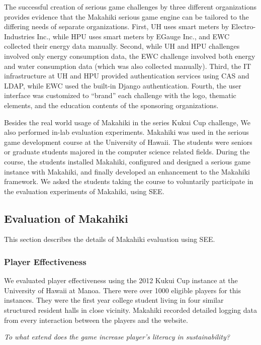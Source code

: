 \documentclass{sigchi}
\begin{document}
The successful creation of serious game challenges by three different
organizations provides evidence that the Makahiki serious game engine
can be tailored to the differing needs of separate
organizations. First, UH uses smart meters by Electro-Industries Inc.,
while HPU uses smart meters by EGauge Inc., and EWC collected their
energy data manually. Second, while UH and HPU challenges involved
only energy consumption data, the EWC challenge involved both energy
and water consumption data (which was also collected manually).
Third, the IT infrastructure at UH and HPU provided authentication
services using CAS and LDAP, while EWC used the built-in Django
authentication. Fourth, the user interface was customized to ``brand''
each challenge with the logo, thematic elements, and the education
contents of the sponsoring organizations.

Besides the real world usage of Makahiki in the series Kukui Cup
challenge, We also performed in-lab evaluation experiments. Makahiki
was used in the serious game development course at the University of
Hawaii. The students were seniors or graduate students majored in the
computer science related fields. During the course, the students 
installed Makahiki, configured and designed a serious game instance with
Makahiki, and finally developed an enhancement to the Makahiki
framework. We asked the students taking the course to voluntarily
participate in the evaluation experiments of Makahiki, using SEE.

\subsection{Evaluation of Makahiki}

This section describes the details of Makahiki evaluation using SEE.

\subsubsection{Player Effectiveness}

We evaluated player effectiveness using the 2012 Kukui Cup instance at
the University of Hawaii at Manoa. There were over 1000 eligible
players for this instances. They were the first year college student
living in four similar structured resident halls in close
vicinity. Makahiki recorded detailed logging data from every
interaction between the players and the website. 

\emph{To what extend does the game increase player's literacy in
  sustainability?}
\end{document}
